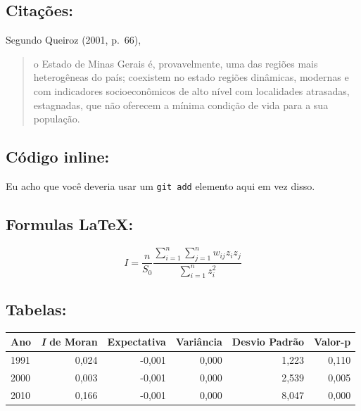 \documentclass[]{article}
\begin{document}
\subsection{Citações:}\label{citacoes}

Segundo Queiroz (2001, p.~66),

\begin{quote}
o Estado de Minas Gerais é, provavelmente, uma das regiões mais
heterogêneas do país; coexistem no estado regiões dinâmicas, modernas e
com indicadores socioeconômicos de alto nível com localidades atrasadas,
estagnadas, que não oferecem a mínima condição de vida para a sua
população.
\end{quote}

\subsection{Código inline:}\label{codigo-inline}

Eu acho que você deveria usar um \texttt{git\ add} elemento aqui em vez
disso.

\subsection{Formulas LaTeX:}\label{formulas-latex}

\[I=\frac{n}{S_{0}}\frac{\displaystyle\sum_{i=1}^{n}\sum_{j=1}^{n}w_{ij}z_{i}z_{j}}{\displaystyle\sum_{i=1}^{n}z^{2}_{i}}\]

\subsection{Tabelas:}\label{tabelas}

\begin{longtable}[]{@{}lrrrrr@{}}
\toprule
Ano & \emph{I} de Moran & Expectativa & Variância & Desvio Padrão &
Valor-p\tabularnewline
\midrule
\endhead
1991 & 0,024 & -0,001 & 0,000 & 1,223 & 0,110\tabularnewline
2000 & 0,003 & -0,001 & 0,000 & 2,539 & 0,005\tabularnewline
2010 & 0,166 & -0,001 & 0,000 & 8,047 & 0,000\tabularnewline
\bottomrule
\end{longtable}

\subsection{}\label{section}
\end{document}

